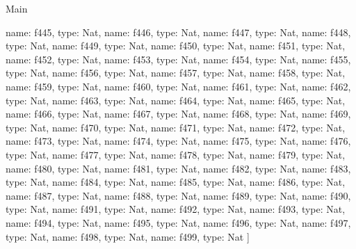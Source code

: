 \begin{lexlean}{Main}
\begin{semanticmodule}
{    {name: f445, type: Nat},
    {name: f446, type: Nat},
    {name: f447, type: Nat},
    {name: f448, type: Nat},
    {name: f449, type: Nat},
    {name: f450, type: Nat},
    {name: f451, type: Nat},
    {name: f452, type: Nat},
    {name: f453, type: Nat},
    {name: f454, type: Nat},
    {name: f455, type: Nat},
    {name: f456, type: Nat},
    {name: f457, type: Nat},
    {name: f458, type: Nat},
    {name: f459, type: Nat},
    {name: f460, type: Nat},
    {name: f461, type: Nat},
    {name: f462, type: Nat},
    {name: f463, type: Nat},
    {name: f464, type: Nat},
    {name: f465, type: Nat},
    {name: f466, type: Nat},
    {name: f467, type: Nat},
    {name: f468, type: Nat},
    {name: f469, type: Nat},
    {name: f470, type: Nat},
    {name: f471, type: Nat},
    {name: f472, type: Nat},
    {name: f473, type: Nat},
    {name: f474, type: Nat},
    {name: f475, type: Nat},
    {name: f476, type: Nat},
    {name: f477, type: Nat},
    {name: f478, type: Nat},
    {name: f479, type: Nat},
    {name: f480, type: Nat},
    {name: f481, type: Nat},
    {name: f482, type: Nat},
    {name: f483, type: Nat},
    {name: f484, type: Nat},
    {name: f485, type: Nat},
    {name: f486, type: Nat},
    {name: f487, type: Nat},
    {name: f488, type: Nat},
    {name: f489, type: Nat},
    {name: f490, type: Nat},
    {name: f491, type: Nat},
    {name: f492, type: Nat},
    {name: f493, type: Nat},
    {name: f494, type: Nat},
    {name: f495, type: Nat},
    {name: f496, type: Nat},
    {name: f497, type: Nat},
    {name: f498, type: Nat},
    {name: f499, type: Nat}
  ]
}


\end{semanticmodule}
\end{lexlean}
